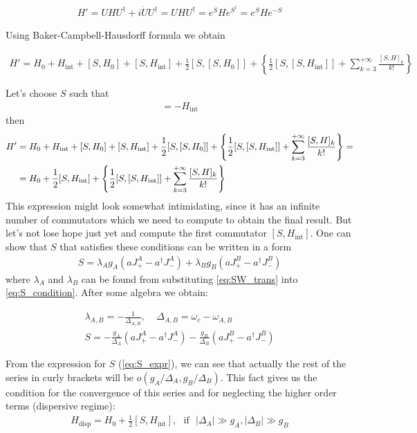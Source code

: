 \documentclass{article}
\numberwithin{equation}{section}
\begin{document}
\begin{gather}
    H' = U H U^\dagger + i \dot{U} U^\dagger = U H U^\dagger = e^S H e^{S^\dagger} = e^S H e^{-S}
\end{gather}

\noindent Using Baker-Campbell-Hausdorff formula we obtain

\begin{gather}
    H' = H_0 + H_\text{int} + [S,H_0] + [S,H_\text{int}] + \frac{1}{2} [S,[S,H_0]] + \left\{ \frac{1}{2} [S,[S,H_\text{int}]] + \sum_{k=3}^{+ \infty} \frac{[S,H]_k}{k!} \right\}
\end{gather}

\noindent  Let's choose $S$ such that 
\begin{gather}
    [S,H_0] = - H_\text{int} \label{eq:S_condition}
\end{gather}
\noindent then
\begin{align}
    H' &= H_0 + H_\text{int} + [S,H_0] + [S, H_\text{int}] + \frac{1}{2} [S,[S,H_0]] + \left\{ \frac{1}{2} [S,[S,H_\text{int}]] + \sum_{k=3}^{+ \infty} \frac{[S,H]_k}{k!} \right\} = \notag \\
    &= H_0 + \frac{1}{2} [S, H_\text{int}] + \left\{ \frac{1}{2} [S,[S,H_\text{int}]] + \sum_{k=3}^{+ \infty} \frac{[S,H]_k}{k!} \right\}
\end{align}
\noindent This expression might look somewhat intimidating, since it has an infinite number of commutators which we need to compute to obtain the final result. But let's not lose hope just yet and compute the first commutator $[S, H_\text{int}]$. One can show that $S$ that satisfies these conditions can be written in a form 
\begin{gather}
    S = \lambda_A g_A (a J_{+}^A - a^\dagger J_{-}^A) + \lambda_B g_B (a J_{+}^B - a^\dagger J_{-}^B) \label{eq:SW_trans}
\end{gather}
\noindent where $\lambda_A$ and $\lambda_B$ can be found from substituting \ref{eq:SW_trans} into \ref{eq:S_condition}. After some algebra we obtain: 

\begin{gather}
    \lambda_{A,B} = - \frac{1}{\Delta_{A,B}},~~~~~\Delta_{A,B} = \omega_c - \omega_{A,B} \\
    S = - \frac{g_A}{\Delta_A} (a J_{+}^A - a^\dagger J_{-}^A) - \frac{g_B}{\Delta_B} (a J_{+}^B - a^\dagger J_{-}^B)  \label{eq:S_expr}
\end{gather}

\noindent From the expression for $S$ (\ref{eq:S_expr}), we can see that actually the rest of the series in curly brackets will be $o(g_A/\Delta_A, g_B/\Delta_B)$. This fact gives us the condition for the convergence of this series and for neglecting the higher order terms (dispersive regime): 
\begin{gather}
    H_\text{disp} = H_0 + \frac{1}{2} [S, H_\text{int}], ~~~\text{if} ~~~|\Delta_A| \gg g_A, |\Delta_B| \gg g_B
\end{gather}
\end{document}
